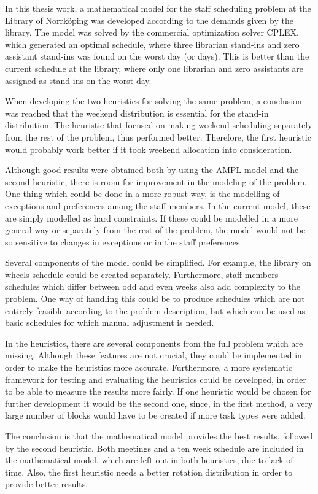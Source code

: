 In this thesis work, a mathematical model for the staff scheduling problem at the Library of Norrköping was developed according to the demands given by the library. The model was solved by the commercial optimization solver CPLEX, which generated an optimal schedule, where three librarian stand-ins and zero assistant stand-ins was found on the worst day (or days). This is better than the current schedule at the library, where only one librarian and zero assistants are assigned as stand-ins on the worst day.

When developing the two heuristics for solving the same problem, a conclusion was reached that the weekend distribution is essential for the stand-in distribution. The heuristic that focused on making weekend scheduling separately from the rest of the problem, thus performed better. Therefore, the first heuristic would probably work better if it took weekend allocation into consideration.

Although good results were obtained both by using the AMPL model and the second heuristic, there is room for improvement in the modeling of the problem. One thing which could be done in a more robust way, is the modelling of exceptions and preferences among the staff members. In the current model, these are simply modelled as hard constraints. If these could be modelled in a more general way or separately from the rest of the problem, the model would not be so sensitive to changes in exceptions or in the staff preferences.

Several components of the model could be simplified. For example, the library on wheels schedule could be created separately. Furthermore, staff members schedules which differ between odd and even weeks also add complexity to the problem. One way of handling this could be to produce schedules which are not entirely feasible according to the problem description, but which can be used as basic schedules for which manual adjustment is needed.

In the heuristics, there are several components from the full problem which are missing. Although these features are not crucial, they could be implemented in order to make the heuristics more accurate. Furthermore, a more systematic framework for testing and evaluating the heuristics could be developed, in order to be able to measure the results more fairly. If one heuristic would be chosen for further development it would be the second one, since, in the first method, a very large number of blocks would have to be created if more task types were added.

The conclusion is that the mathematical model provides the best results, followed by the second heuristic. Both meetings and a ten week schedule are included in the mathematical model, which are left out in both heuristics, due to lack of time. Also, the first heuristic needs a better rotation distribution in order to provide better results.

